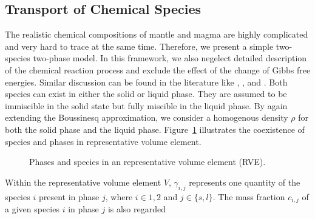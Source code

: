 \subsection{Transport of Chemical Species}
The realistic chemical compositions of mantle and magma are highly
complicated and very hard to trace at the same time. 
Therefore, we present a simple two-species two-phase model. 
In this framework, we also negelect detailed description of the chemical reaction 
process and exclude the effect of the change of Gibbs free energies. 
Similar discussion can be found in the literature like 
\citet{ConsequencesMeltTransport}, \citet{PartialMeltinginUpwellingMantleColumn}, \citet{MagmaDynamicsEnthalpyMethod} 
and \citet{DownwardOxidantTransport}.
Both species can exist in either the solid or liquid phase. They are assumed to 
be immiscible in the solid state but fully miscible in the liquid phase.
By again extending the Boussinesq approximation, we consider a homogenous density
$\rho$ for both the solid phase and the liquid phase. Figure~\ref{fig:RVE} illustrates 
the coexistence of species and phases in representative volume element.
\begin{figure}[ht]
\centering\small
{}
\caption{Phases and species in an representative volume element (RVE).\label{fig:RVE}}
\end{figure}
Within the representative volume element $V$, $\gamma_{i,j}$ represents one quantity of the species $i$ present in
phase $j$, where $i \in {1,2}$ and $j \in \{s,l\}$.   
The mass fraction $c_{i,j}$ of a given species $i$ in phase $j$ is also regarded 
